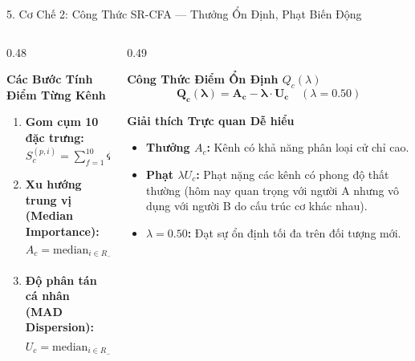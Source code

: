 \documentclass[aspectratio=169,10pt]{beamer}
\begin{document}
\begin{frame}{5. Cơ Chế 2: Công Thức SR-CFA --- Thưởng Ổn Định, Phạt Biến Động}
    \begin{columns}[T]
        \begin{column}{0.48\textwidth}
            \begin{block}{\textbf{Các Bước Tính Điểm Từng Kênh}}
                \scriptsize
                \begin{enumerate}
                    \item \textbf{Gom cụm 10 đặc trưng:} $S_c^{(p,i)} = \sum_{f=1}^{10} \Phi_{c,f}^{(p,i)}$
                    \item \textbf{Xu hướng trung vị (Median Importance):}\\
                    $A_c = \text{median}_{i \in R_{-p}} (S_c^{(p,i)})$
                    \item \textbf{Độ phân tán cá nhân (MAD Dispersion):}\\
                    $U_c = \text{median}_{i \in R_{-p}} |S_c^{(p,i)} - A_c|$
                \end{enumerate}
            \end{block}
        \end{column}
        
        \begin{column}{0.49\textwidth}
            \begin{alertblock}{\textbf{Công Thức Điểm Ổn Định $Q_c(\lambda)$}}
                \small
                \[
                    \mathbf{Q_c(\lambda) = A_c - \lambda \cdot U_c} \quad (\lambda = 0.50)
                \]
            \end{alertblock}
            
            \begin{exampleblock}{\textbf{Giải thích Trực quan Dễ hiểu}}
                \scriptsize
                \begin{itemize}
                    \item \textbf{Thưởng $A_c$:} Kênh có khả năng phân loại cử chỉ cao.
                    \item \textbf{Phạt $\lambda U_c$:} Phạt nặng các kênh có phong độ thất thường (hôm nay quan trọng với người A nhưng vô dụng với người B do cấu trúc cơ khác nhau).
                    \item \textbf{$\lambda = 0.50$:} Đạt sự ổn định tối đa trên đối tượng mới.
                \end{itemize}
            \end{exampleblock}
        \end{column}
    \end{columns}
\end{frame}
\end{document}
